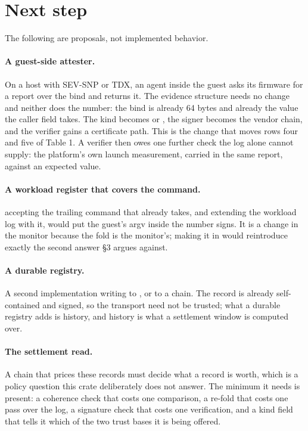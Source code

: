\documentclass[11pt]{article}
\theoremstyle{definition}
\begin{document}
\section{Next step}
\label{sec:next}

The following are proposals, not implemented behavior.

\paragraph{A guest-side attester.} On a host with SEV-SNP or TDX, an agent inside
the guest asks its firmware for a report over the bind and returns it. The
evidence structure needs no change and neither does the number: the bind is
already 64 bytes and already the value the caller field takes. The kind becomes
 or , the signer becomes the vendor chain, and the verifier
gains a certificate path. This is the change that moves rows four and five of
Table 1. A verifier then owes one further check the log alone cannot supply: the
platform's own launch measurement, carried in the same report, against an
expected value.

\paragraph{A workload register that covers the command.} 
accepting the trailing command that  already takes, and
extending the workload log with it, would put the guest's argv inside the number
 signs. It is a change in the monitor because the fold is the
monitor's; making it in  would reintroduce exactly the second answer
§3 argues against.

\paragraph{A durable registry.} A second  implementation writing to
, or to a chain. The record is already self-contained and signed,
so the transport need not be trusted; what a durable registry adds is history, and
history is what a settlement window is computed over.

\paragraph{The settlement read.} A chain that prices these records must decide
what a record is worth, which is a policy question this crate deliberately does
not answer. The minimum it needs is present: a coherence check that costs one
comparison, a re-fold that costs one pass over the log, a signature check that
costs one verification, and a kind field that tells it which of the two trust
bases it is being offered.
\end{document}
